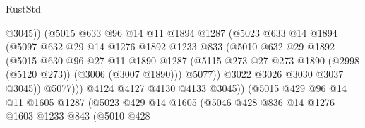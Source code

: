 \begin{lexlean}{RustStd}
\begin{coremodule}
                                @3045))
                            (@5015
                              @633
                              @96
                              @14
                              @11
                              @1894
                              @1287
                              (@5023
                                @633
                                @14
                                @1894
                                (@5097
                                  @632
                                  @29
                                  @14
                                  @1276
                                  @1892
                                  @1233
                                  @833
                                  (@5010
                                    @632
                                    @29
                                    @1892
                                    (@5015
                                      @630
                                      @96
                                      @27
                                      @11
                                      @1890
                                      @1287
                                      (@5115
                                        @273
                                        @27
                                        @273
                                        @1890
                                        (@2998 (@5120 @273))
                                        (@3006 (@3007 @1890)))
                                      @5077))
                                  @3022
                                  @3026
                                  @3030
                                  @3037
                                  @3045))
                              @5077)))
                        @4124
                        @4127
                        @4130
                        @4133
                        @3045))
                    (@5015
                      @429
                      @96
                      @14
                      @11
                      @1605
                      @1287
                      (@5023
                        @429
                        @14
                        @1605
                        (@5046
                          @428
                          @836
                          @14
                          @1276
                          @1603
                          @1233
                          @843
                          (@5010
                            @428

\end{coremodule}
\end{lexlean}
